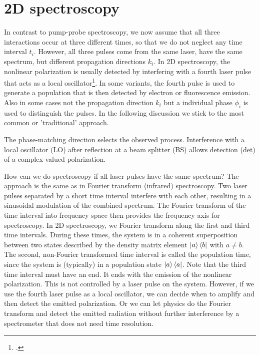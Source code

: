 \section{2D spectroscopy}


In contrast to pump-probe spectroscopy, we now assume that all three interactions occur at three different times, so that we do not neglect any time interval $t_i$. However, all three pulses come from the same laser, have the same spectrum, but different propagation directions $k_i$. In 2D spectroscopy, the nonlinear polarization is usually detected by interfering with a fourth laser pulse that acts as a local oscillator\footcite{Ogilvie15,Scholes13}. In some variants, the fourth pulse is used to generate a population that is then detected by electron or fluorescence emission. Also in some cases not the propagation direction $k_i$ but a individual phase $\phi_i$ is used to distinguish the pulses. In the following discussion we stick to the most common or 'traditional' approach.

\begin{marginfigure}

\caption{The phase-matching direction selects the observed process. Interference with a local oscillator (LO) after reflection at a beam splitter (BS) allows detection (det) of a complex-valued polarization.}
\label{fig:2d_setup_phasematch}
\end{marginfigure}


How can we do spectroscopy if all laser pulses have the same spectrum? The approach is the same as in Fourier transform (infrared) spectroscopy. Two laser pulses separated by a short time interval interfere with each other, resulting in a sinusoidal modulation of the combined spectrum. The Fourier transform of the time interval into frequency space then provides the frequency axis for spectroscopy. In 2D spectroscopy, we Fourier transform along the first and third time intervals. During these times, the system is in a coherent superposition between two states described by the density matrix element $\ket{a}\bra{b}$ with $a \neq b$. The second, non-Fourier transformed time interval is called the population time, since the system is (typically) in a population state $\ket{a}\bra{a}$. Note that the third time interval must have an end. It ends with the emission of the nonlinear polarization. This is not controlled by a laser pulse on the system. However, if we use the fourth laser pulse as a local oscillator, we can decide when to amplify and then detect the emitted polarization. Or we can let physics do the Fourier transform and detect the emitted radiation without further interference by a spectrometer that does not need time resolution.

